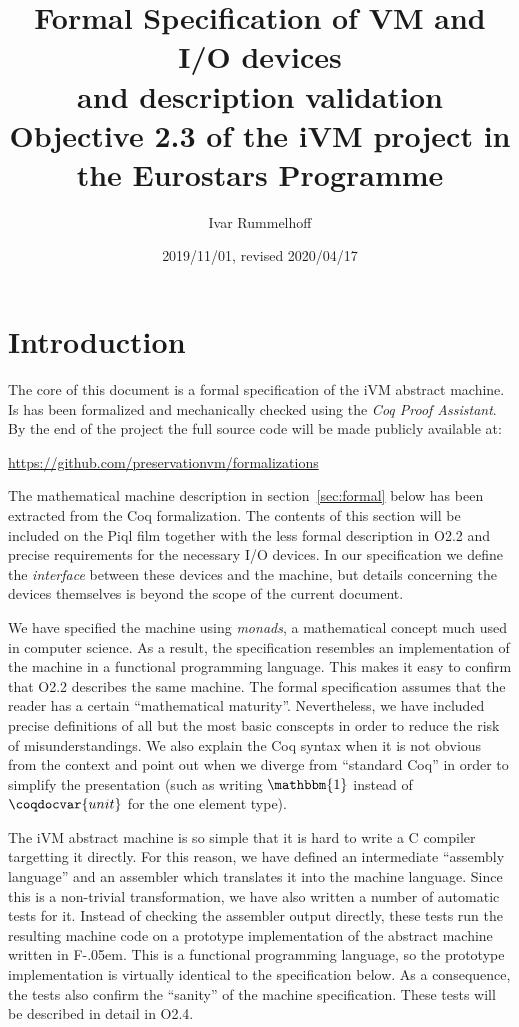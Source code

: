\documentclass[10pt,a4paper]{article}
\title{%
  Formal Specification of VM and I/O devices\\
  and description validation\\[2ex]
  \large \textbf{Objective 2.3} of the iVM project in the Eurostars Programme
}
\author{Ivar Rummelhoff}
\date{2019/11/01, revised 2020/04/17}
\newcommand{\FSharp}{\textsf{F\nolinebreak[4]\kern-.05em\raisebox{.2ex}{\small\#}}\xspace}
\begin{document}
\maketitle

\section{Introduction}

The core of this document is a formal specification of the iVM abstract machine. Is has been formalized and mechanically checked using the \emph{Coq Proof Assistant}. By the end of the project the full source code will be made publicly available at:

\begin{center}
  \url{https://github.com/preservationvm/formalizations}
\end{center}

The mathematical machine description in section~\ref{sec:formal} below has been extracted from the Coq formalization. The contents of this section will be included on the Piql film together with the less formal description in O2.2 and precise requirements for the necessary I/O devices. In our specification we define the \emph{interface} between these devices and the machine, but details concerning the devices themselves is beyond the scope of the current document.

We have specified the machine using \emph{monads}, a mathematical concept much used in computer science. As a result, the specification resembles an implementation of the machine in a functional programming language. This makes it easy to confirm that O2.2 describes the same machine. The formal specification assumes that the reader has a certain ``mathematical maturity''. Nevertheless, we have included precise definitions of all but the most basic conscepts in order to reduce the risk of misunderstandings. We also explain the Coq syntax when it is not obvious from the context and point out when we diverge from ``standard Coq'' in order to simplify the presentation (such as writing $\mathbbm{1}$ instead of $\coqdocvar{unit}$ for the one element type).

The iVM abstract machine is so simple that it is hard to write a C compiler targetting it directly. For this reason, we have defined an intermediate ``assembly language'' and an assembler which translates it into the machine language. Since this is a non-trivial transformation, we have also written a number of automatic tests for it. Instead of checking the assembler output directly, these tests run the resulting machine code on a prototype implementation of the abstract machine written in \FSharp. This is a functional programming language, so the prototype implementation is virtually identical to the specification below. As a consequence, the tests also confirm the ``sanity'' of the machine specification. These tests will be described in detail in O2.4.
\end{document}
